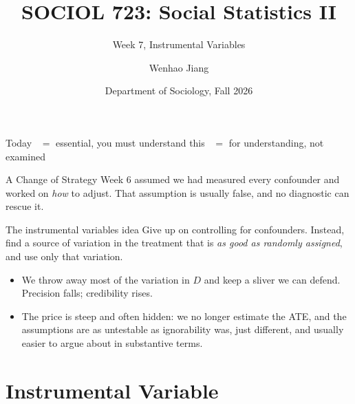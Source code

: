 \documentclass[aspectratio=169,11pt,xcolor=dvipsnames]{beamer}
\title[SOCIOL 723]{SOCIOL 723: Social Statistics II\\[-2pt]}
\subtitle{Week 7, Instrumental Variables\\[-6pt]}
\author[Jiang]{Wenhao Jiang\vspace{-2.5em}}
\institute[Duke]{}
\date{Department of Sociology, Fall 2026}
\newcommand{\adv}{\,\raisebox{0.6pt}{\textcolor{accent}{$\bigstar$}}}
\newcommand{\core}{\,\raisebox{0.6pt}{\textcolor{corestar}{$\bigstar$}}}
\begin{document}
\begin{frame}[plain]
  \titlepage
\end{frame}

\begin{frame}{Today}
  \tableofcontents
  \vskip6pt
  {\footnotesize \core{} $=$ essential, you must understand this \quad\quad \adv{} $=$ for understanding, not examined}
\end{frame}

\begin{frame}{A Change of Strategy}
Week 6 assumed we had measured every confounder and worked on \emph{how} to
adjust. That assumption is usually false, and no diagnostic can rescue it.
\vskip3pt
\begin{alertblock}{The instrumental variables idea}
Give up on controlling for confounders. Instead, find a source of variation in
the treatment that is \emph{as good as randomly assigned}, and use only that
variation.
\end{alertblock}
\vskip3pt
\begin{itemize}\itemsep2pt
  \item We throw away most of the variation in $D$ and keep a sliver we can
        defend. Precision falls; credibility rises.
  \item The price is steep and often hidden: we no longer estimate the ATE, and
        the assumptions are as untestable as ignorability was, just different,
        and usually easier to argue about in substantive terms.
\end{itemize}
\end{frame}

\section[IV]{Instrumental Variable}
\begin{frame}\sectionpage\end{frame}
\end{document}

